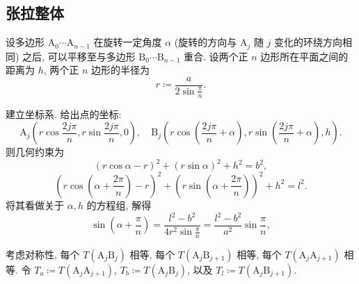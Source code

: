 \documentclass{article}
\begin{document}
\subsection{张拉整体}

设多边形 $\mathrm A_0\cdots\mathrm A_{n-1}$ 在旋转一定角度 $\alpha$
(旋转的方向与 $\mathrm A_j$ 随 $j$ 变化的环绕方向相同) 之后,
可以平移至与多边形 $\mathrm B_0\cdots\mathrm B_{n-1}$ 重合.
设两个正 $n$ 边形所在平面之间的距离为 $h$,
两个正 $n$ 边形的半径为
\begin{equation}
	r\coloneqq \frac a{2\sin\frac\pi n}.
\end{equation}

建立坐标系. 给出点的坐标:
\begin{equation}
	\mathrm A_j\left(r\cos\frac{2j\pi}n,r\sin\frac{2j\pi}n,0\right),
	\quad\mathrm B_j\left(r\cos\!\left(\frac{2j\pi}n+\alpha\right),r\sin\!\left(\frac{2j\pi}n+\alpha\right),h\right).
\end{equation}
则几何约束为
\begin{equation}
	\left(r\cos\alpha-r\right)^2+\left(r\sin\alpha\right)^2+h^2=b^2,
\end{equation}
\begin{equation}
	\left(r\cos\!\left(\alpha+\frac{2\pi}n\right)-r\right)^2
	+\left(r\sin\!\left(\alpha+\frac{2\pi}n\right)\right)^2+h^2=l^2.
\end{equation}
将其看做关于 $\alpha,h$ 的方程组, 解得
\begin{equation}
	\sin\!\left(\alpha+\frac\pi n\right)
	=\frac{l^2-b^2}{4r^2\sin\frac\pi n}
	=\frac{l^2-b^2}{a^2}\sin\frac\pi n,
	\label{eq:几何约束三角方程}
\end{equation}

考虑对称性, 每个 $T\!\left(\mathrm A_j\mathrm B_j\right)$ 相等,
每个 $T\!\left(\mathrm A_j\mathrm B_{j+1}\right)$ 相等,
每个 $T\!\left(\mathrm A_j\mathrm A_{j+1}\right)$ 相等.
令 $T_a\coloneqq T\!\left(\mathrm A_j\mathrm A_{j+1}\right)$,
$T_b\coloneqq T\!\left(\mathrm A_j\mathrm B_j\right)$,
以及 $T_l\coloneqq T\!\left(\mathrm A_j\mathrm B_{j+1}\right)$.
\end{document}
